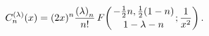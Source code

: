 \[\mathop{C^{(\lambda)}_{n}\/}\nolimits\!\left(x\right)=(2x)^{n}\frac{\left(%
\lambda\right)_{n}}{n!}\mathop{F\/}\nolimits\!\left({-\frac{1}{2}n,\frac{1}{2}%
(1-n)\atop 1-\lambda-n};\frac{1}{x^{2}}\right).\]